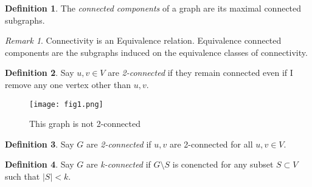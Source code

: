 \documentclass{article}
\theoremstyle{definition}
\newtheorem{definition}{Definition}
\theoremstyle{example}
\theoremstyle{remark}
\newtheorem*{remark}{Remark}
\begin{document}
  \begin{definition}
    The \textit{connected components} of a graph are its maximal connected subgraphs.
  \end{definition}
  \begin{remark}
  Connectivity is an Equivalence relation. Equivalence connected components are the subgraphs induced on the equivalence classes of connectivity.
  \end{remark}
  \begin{definition}
    Say $u,v \in V$ are \textit{2-connected} if they remain connected even if I remove any one vertex other than $u,v$.
  \end{definition}
      \begin{figure}[H]
    \centering
      \texttt{[image: fig1.png]}
      \caption{This graph is not 2-connected}
    \end{figure}
  \begin{definition}
    Say $G$ are \textit{2-connected} if $u,v$ are 2-connected for all $u,v \in V$.
  \end{definition}

  \begin{definition}
    Say $G$ are \textit{k-connected} if $G\setminus S$ is conencted for any subset $S\subset V$ such that $|S|<k$.
  \end{definition}
\end{document}
